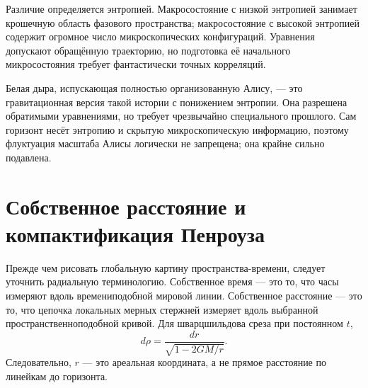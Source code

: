 Различие определяется энтропией. Макросостояние с низкой энтропией занимает крошечную область фазового пространства; макросостояние с высокой энтропией содержит огромное число микроскопических конфигураций. Уравнения допускают обращённую траекторию, но подготовка её начального микросостояния требует фантастически точных корреляций.

\begin{classroomqa}
\end{classroomqa}

Белая дыра, испускающая полностью организованную Алису, — это гравитационная версия такой истории с понижением энтропии. Она разрешена обратимыми уравнениями, но требует чрезвычайно специального прошлого. Сам горизонт несёт энтропию и скрытую микроскопическую информацию, поэтому флуктуация масштаба Алисы логически не запрещена; она крайне сильно подавлена.

\begin{classroomqa}
\end{classroomqa}

\section{Собственное расстояние и компактификация Пенроуза}

Прежде чем рисовать глобальную картину пространства-времени, следует уточнить радиальную терминологию. Собственное время — это то, что часы измеряют вдоль времениподобной мировой линии. Собственное расстояние — это то, что цепочка локальных мерных стержней измеряет вдоль выбранной пространственноподобной кривой. Для шварцшильдова среза при постоянном \(t\),
\begin{equation}
d\rho=\frac{dr}{\sqrt{1-2GM/r}}.
\label{eq:l04-proper-distance}
\end{equation}
Следовательно, \(r\) — это ареальная координата, а не прямое расстояние по линейкам до горизонта.

